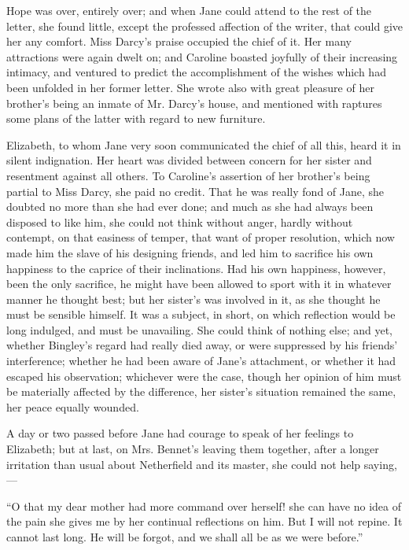 \documentclass[12pt,openright]{book}
\begin{document}
Hope was over, entirely over; and when Jane could attend to the rest of the letter, she found little, except the professed affection of the writer, that could give her any comfort. Miss Darcy’s praise occupied the chief of it. Her many attractions were again dwelt on; and Caroline boasted joyfully of their increasing intimacy, and ventured to predict the accomplishment of the wishes which had been unfolded in her former letter. She wrote also with great pleasure of her brother’s being an inmate of Mr. Darcy’s house, and mentioned with raptures some plans of the latter with regard to new furniture.

Elizabeth, to whom Jane very soon communicated the chief of all this, heard it in silent indignation. Her heart was divided between concern for her sister and resentment against all others. To Caroline’s assertion of her brother’s being partial to Miss Darcy, she paid no credit. That he was really fond of Jane, she doubted no more than she had ever done; and much as she had always been disposed to like him, she could not think without anger, hardly without contempt, on that easiness of temper, that want of proper resolution, which now made him the slave of his designing friends, and led him to sacrifice his own happiness to the caprice of their inclinations. Had his own happiness, however, been the only sacrifice, he might have been allowed to sport with it in whatever manner he thought best; but her sister’s was involved in it, as she thought he must be sensible himself. It was a subject, in short, on which reflection would be long indulged, and must be unavailing. She could think of nothing else; and yet, whether Bingley’s regard had really died away, or were suppressed by his friends’ interference; whether he had been aware of Jane’s attachment, or whether it had escaped his observation; whichever were the case, though her opinion of him must be materially affected by the difference, her sister’s situation remained the same, her peace equally wounded.

A day or two passed before Jane had courage to speak of her feelings to Elizabeth; but at last, on Mrs. Bennet’s leaving them together, after a longer irritation than usual about Netherfield and its master, she could not help saying,—

“O that my dear mother had more command over herself! she can have no idea of the pain she gives me by her continual reflections on him. But I will not repine. It cannot last long. He will be forgot, and we shall all be as we were before.”
\end{document}
